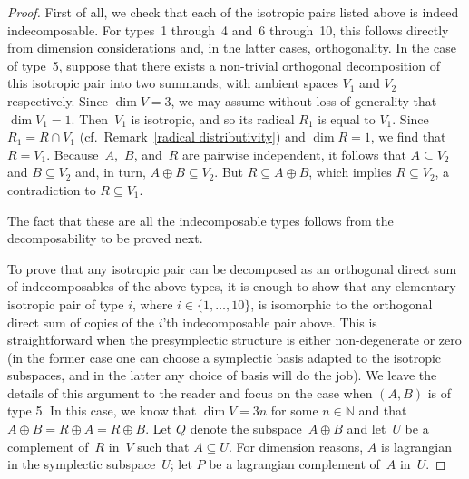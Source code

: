 \documentclass[10pt,a4paper]{amsart}
\numberwithin{equation}{section}
\begin{document}
\begin{proof}
First of all, we check that each of the isotropic pairs listed above is indeed indecomposable. For types~1 through~4 and~6 through~10,  this follows directly from dimension considerations and, in the latter cases, orthogonality. In the case of type~5, suppose that there exists a non-trivial orthogonal decomposition of this isotropic pair into two summands, with ambient spaces $V_1$ and $V_2$ respectively. Since $\dim V = 3$, we may assume without loss of generality that $\dim V_1 = 1$. Then~$V_1$ is isotropic, and so its radical $R_1$ is equal to $V_1$. Since $R_1 = R \cap V_1$ (cf.\ Remark~\ref{radical distributivity}) and $\dim R = 1$, we f\/ind that $R = V_1$. Because~$A$,~$B$, and~$R$ are pairwise independent, it follows that $A \subseteq V_2$ and $B \subseteq V_2$ and, in turn, $A \oplus B \subseteq V_2$. But $R \subseteq A \oplus B$, which implies $R \subseteq V_2$, a contradiction to $R \subseteq V_1$.

The fact that these are all the indecomposable types follows from the decomposability to be proved next.

To prove that any isotropic pair can be decomposed as an orthogonal direct sum of indecomposables of the above types, it is enough to show that any elementary isotropic pair of type $i$,
where $i \in \{1,\dots ,10\}$,  is isomorphic to the orthogonal direct sum of copies of the $i$'th indecomposable pair above. This is straightforward when the presymplectic structure is either non-degenerate or zero (in the former case one can choose a symplectic basis adapted to the isotropic subspaces, and in the latter any choice of basis will do the job). We leave the details of this argument  to the reader and focus on the case when $(A,B)$ is of type 5.   In this case, we know that $\dim V = 3n$ for some $n \in \mathbb{N}$ and that $A \oplus B  = R \oplus A = R \oplus B$. Let $Q$
denote the subspace~$A \oplus B$ and let~$U$ be a complement of~$R$ in~$V$ such that $A \subseteq U$. For dimension reasons, $A$ is lagrangian in the symplectic subspace~$U$; let $P$ be a lagrangian complement of~$A$ in~$U$.


\end{proof}
\end{document}
